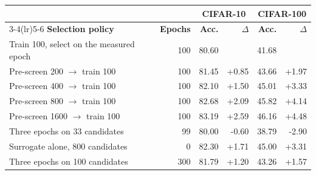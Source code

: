 \begin{tabular}{l r rr rr}
\toprule
& & \multicolumn{2}{c}{CIFAR-10} & \multicolumn{2}{c}{CIFAR-100} \\
\cmidrule(lr){3-4}\cmidrule(lr){5-6}
\textbf{Selection policy} & \textbf{Epochs} & \textbf{Acc.} & $\Delta$ & \textbf{Acc.} & $\Delta$ \\
\midrule
Train 100, select on the measured epoch & 100 & 80.60 &  & 41.68 &  \\
\midrule
Pre-screen 200 $\to$ train 100 & 100 & 81.45 & +0.85 & 43.66 & +1.97 \\
Pre-screen 400 $\to$ train 100 & 100 & 82.10 & +1.50 & 45.01 & +3.33 \\
Pre-screen 800 $\to$ train 100 & 100 & 82.68 & +2.09 & 45.82 & +4.14 \\
Pre-screen 1600 $\to$ train 100 & 100 & 83.19 & +2.59 & 46.16 & +4.48 \\
Three epochs on 33 candidates & 99 & 80.00 & -0.60 & 38.79 & -2.90 \\
Surrogate alone, 800 candidates & 0 & 82.30 & +1.71 & 45.00 & +3.31 \\
Three epochs on 100 candidates & 300 & 81.79 & +1.20 & 43.26 & +1.57 \\
\bottomrule
\end{tabular}
